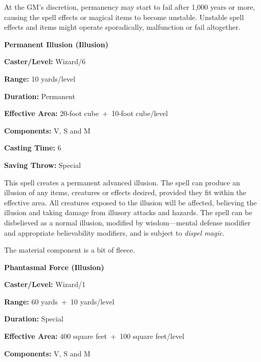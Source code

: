 \begin{multicols}{2}
At the GM's discretion, permanency may start to fail after 1,000 years or more, causing the spell effects or magical items to become unstable. Unstable spell effects and items might operate sporadically, malfunction or fail altogether.

\vspace{1em}

\noindent
\begin{minipage}{\columnwidth}

\noindent \textbf{Permanent Illusion (Illusion)}

\noindent \textbf{Caster/Level:} Wizard/6

\noindent \textbf{Range:} 10 yards/level

\noindent \textbf{Duration:} Permanent

\noindent \textbf{Effective Area:} 20-foot cube~+~10-foot cube/level

\noindent \textbf{Components:} V, S and M

\noindent \textbf{Casting Time:} 6

\noindent \textbf{Saving Throw:} Special

\end{minipage}

This spell creates a permanent advanced illusion.  The spell can produce an illusion of any items, creatures or effects desired, provided they fit within the effective area.  All creatures exposed to the illusion will be affected, believing the illusion and taking damage from illusory attacks and hazards.  The spell can be disbelieved as a normal illusion, modified by wisdom---mental defense modifier and appropriate believability modifiers, and is subject to \textit{dispel magic}.

The material component is a bit of fleece.

\vspace{1em}

\noindent
\begin{minipage}{\columnwidth}

\noindent \textbf{Phantasmal Force (Illusion)}

\noindent \textbf{Caster/Level:} Wizard/1

\noindent \textbf{Range:} 60 yards~+~10 yards/level

\noindent \textbf{Duration:} Special

\noindent \textbf{Effective Area:} 400 square feet~+~100 square feet/level

\noindent \textbf{Components:} V, S and M


\end{minipage}
\end{multicols}
